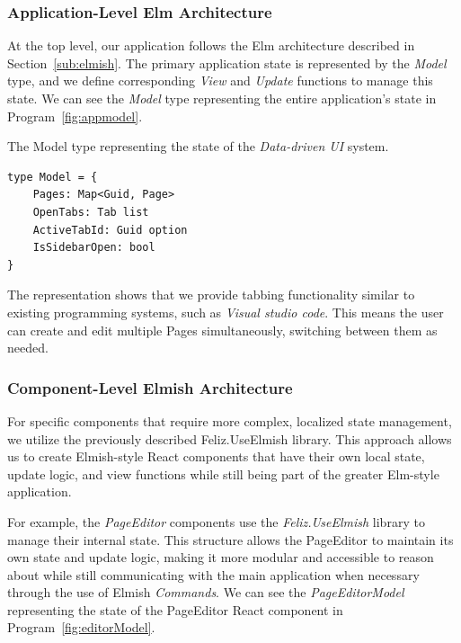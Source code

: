 \subsubsection{Application-Level Elm Architecture}

At the top level, our application follows the Elm architecture described in Section~\ref{sub:elmish}.
The primary application state is represented by the \emph{Model} type, and we define corresponding \emph{View} and \emph{Update} functions to manage this state.
We can see the \emph{Model} type representing the entire application's state in Program~\ref{fig:appmodel}.

\begin{listing}[htbp]
	\caption{The Model type representing the state of the \emph{Data-driven UI} system.}
	\label{fig:appmodel}
	\begin{lstlisting}
type Model = {
    Pages: Map<Guid, Page>
    OpenTabs: Tab list
    ActiveTabId: Guid option
    IsSidebarOpen: bool
}
    \end{lstlisting}
\end{listing}

The representation shows that we provide tabbing functionality similar to existing programming systems, such as \emph{Visual studio code}.
This means the user can create and edit multiple Pages simultaneously, switching between them as needed.

\subsubsection{Component-Level Elmish Architecture}

For specific components that require more complex, localized state management,
we utilize the previously described Feliz.UseElmish library.
This approach allows us to create Elmish-style React components
that have their own local state, update logic, and view functions while still being part of the greater Elm-style application.

For example, the \emph{PageEditor} components use the \emph{Feliz.UseElmish} library to manage their internal state.
This structure allows the PageEditor to maintain its own state and update logic,
making it more modular and accessible to reason about while still communicating with the main application when necessary through the use of Elmish \emph{Commands}.
We can see the \emph{PageEditorModel} representing the state of the PageEditor React component in Program~\ref{fig:editorModel}.

